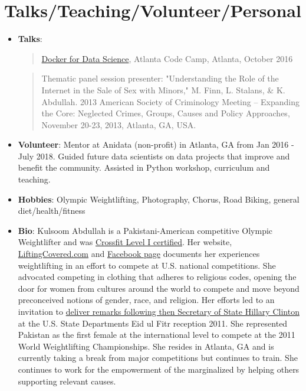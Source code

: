 \documentclass[letterpaper,11pt]{article}
\newcommand{\resumeItem}[2]{
  \item\small{
    \textbf{#1}{: #2 \vspace{-2pt}}
  }
}
\newcommand{\resumeSubItem}[2]{\resumeItem{#1}{#2}\vspace{-4pt}}
\newcommand{\resumeSubHeadingListStart}{\begin{itemize}[leftmargin=*]}
\newcommand{\resumeSubHeadingListEnd}{\end{itemize}}
\begin{document}
\section{Talks/Teaching/Volunteer/Personal}
  \resumeSubHeadingListStart
    \resumeSubItem{Talks}{}
            \begin{quote}
     \href{https://www.youtube.com/watch?v=j17ckY6sn5s&feature=youtu.be}{Docker for Data Science}, Atlanta Code Camp, Atlanta, October 2016
        \end{quote}
          \begin{quote}
      Thematic panel session presenter: "Understanding the Role of the Internet in the Sale of Sex with Minors," M. Finn, L. Stalans, \& K. Abdullah.  2013 American Society of Criminology Meeting -- Expanding the Core: Neglected Crimes, Groups, Causes and Policy Approaches, November 20-23, 2013, Atlanta, GA, USA. 
        \end{quote}
     \resumeSubItem{Volunteer}        
        { Mentor at Anidata (non-profit) in Atlanta, GA from Jan 2016 - July 2018.  Guided future data scientists on data projects that improve and benefit the community. Assisted in Python workshop, curriculum and teaching.}
        
        
    \resumeSubItem{Hobbies}
      { Olympic Weightlifting, Photography, Chorus, Road Biking, general diet/health/fitness }
    \resumeSubItem{Bio}
      {Kulsoom Abdullah is a Pakistani-American competitive Olympic Weightlifter and was \href{http://bit.ly/1n1SrIA}{Crossfit Level I certified}. Her website, \href{liftingcovered.com}{LiftingCovered.com} and \href{http://on.fb.me/205IeJH}{Facebook page} documents her experiences weightlifting in an effort to compete at U.S. national competitions.  She advocated competing in clothing that adheres to religious codes, opening the door for women from cultures around the world to compete and move beyond preconceived notions of gender, race, and religion.  Her efforts led to an invitation to \href{http://bit.ly/1JQ5vLK}{deliver remarks following then Secretary of State Hillary Clinton} at the U.S. State Department\textsc{\char13}s Eid ul Fitr reception 2011.  She represented Pakistan as the first female at the international level to compete at the 2011 World Weightlifting Championships.  She resides in Atlanta, GA and is currently taking a break from major competitions but continues to train. She continues to work for the empowerment of the marginalized by helping others supporting relevant causes.}

  \resumeSubHeadingListEnd
\end{document}
